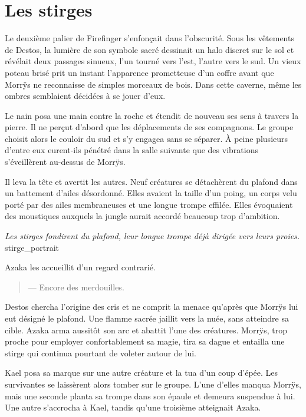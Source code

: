 \chapter{Les stirges}

Le deuxième palier de Firefinger s'enfonçait dans l'obscurité. Sous les vêtements de Destos, la lumière de son symbole sacré dessinait un halo discret sur le sol et révélait deux passages sinueux, l'un tourné vers l'est, l'autre vers le sud. Un vieux poteau brisé prit un instant l'apparence prometteuse d'un coffre avant que Morrÿs ne reconnaisse de simples morceaux de bois. Dans cette caverne, même les ombres semblaient décidées à se jouer d'eux.

Le nain posa une main contre la roche et étendit de nouveau ses sens à travers la pierre. Il ne perçut d'abord que les déplacements de ses compagnons. Le groupe choisit alors le couloir du sud et s'y engagea sans se séparer. À peine plusieurs d'entre eux eurent-ils pénétré dans la salle suivante que des vibrations s'éveillèrent au-dessus de Morrÿs.

Il leva la tête et avertit les autres. Neuf créatures se détachèrent du plafond dans un battement d'ailes désordonné. Elles avaient la taille d'un poing, un corps velu porté par des ailes membraneuses et une longue trompe effilée. Elles évoquaient des moustiques auxquels la jungle aurait accordé beaucoup trop d'ambition.

{\textit{Les stirges fondirent du plafond, leur longue trompe déjà dirigée vers leurs proies.}}
{stirge_portrait}

Azaka les accueillit d'un regard contrarié.

\begin{quote}
--- Encore des merdouilles.
\end{quote}

\scenebreak

Destos chercha l'origine des cris et ne comprit la menace qu'après que Morrÿs lui eut désigné le plafond. Une flamme sacrée jaillit vers la nuée, sans atteindre sa cible. Azaka arma aussitôt son arc et abattit l'une des créatures. Morrÿs, trop proche pour employer confortablement sa magie, tira sa dague et entailla une stirge qui continua pourtant de voleter autour de lui.

Kael posa sa marque sur une autre créature et la tua d'un coup d'épée. Les survivantes se laissèrent alors tomber sur le groupe. L'une d'elles manqua Morrÿs, mais une seconde planta sa trompe dans son épaule et demeura suspendue à lui. Une autre s'accrocha à Kael, tandis qu'une troisième atteignait Azaka.

